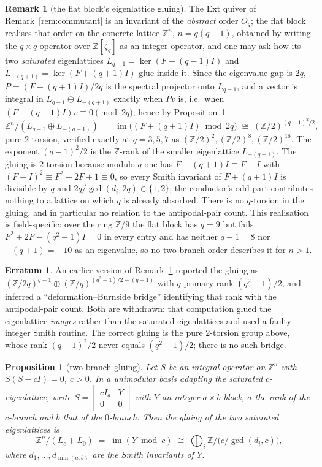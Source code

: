 \documentclass[11pt]{article}
\theoremstyle{plain}
\newtheorem{proposition}[theorem]{Proposition}
\theoremstyle{definition}
\newtheorem{remark}[theorem]{Remark}
\newtheorem{erratum}[theorem]{Erratum}
\newcommand{\ZZ}{\mathbb Z}
\begin{document}
\begin{remark}[the flat block's eigenlattice gluing]\label{rem:real-gluing}
The Ext quiver of Remark~\ref{rem:commutant} is an invariant of the
\emph{abstract} order $O_q$; the flat block realises that order on the concrete
lattice $\ZZ^n$, $n=q(q-1)$, obtained by writing the $q\times q$ operator over
$\ZZ[\zeta_q]$ as an integer operator, and one may ask how its two
\emph{saturated} eigenlattices $L_{q-1}=\ker(F-(q-1)I)$ and
$L_{-(q+1)}=\ker(F+(q+1)I)$ glue inside it. Since the eigenvalue gap is $2q$,
$P=(F+(q+1)I)/2q$ is the spectral projector onto $L_{q-1}$, and a vector is
integral in $L_{q-1}\oplus L_{-(q+1)}$ exactly when $Pv$ is, i.e.\ when
$(F+(q+1)I)v\equiv 0\pmod{2q}$; hence by Proposition~\ref{prop:two-branch}
\[
\ZZ^n/(L_{q-1}\oplus L_{-(q+1)})\;=\;\operatorname{im}\bigl((F+(q+1)I)\bmod 2q\bigr)
\;\cong\;(\ZZ/2)^{(q-1)^2/2},
\]
pure $2$-torsion, verified exactly at $q=3,5,7$ as $(\ZZ/2)^2,(\ZZ/2)^8,
(\ZZ/2)^{18}$. The exponent $(q-1)^2/2$ is the $\ZZ$-rank of the smaller
eigenlattice $L_{-(q+1)}$. The gluing is $2$-torsion because modulo $q$ one has
$F+(q+1)I\equiv F+I$ with $(F+I)^2\equiv F^2+2F+1\equiv 0$, so every Smith
invariant of $F+(q+1)I$ is divisible by $q$ and $2q/\gcd(d_i,2q)\in\{1,2\}$; the
conductor's odd part contributes nothing to a lattice on which $q$ is already
absorbed. There is no $q$-torsion in the gluing, and in particular no relation to
the antipodal-pair count. This realisation is field-specific: over the ring
$\ZZ/9$ the flat block has $q=9$ but fails $F^2+2F-(q^2-1)I=0$ in every entry and
has neither $q-1=8$ nor $-(q+1)=-10$ as an eigenvalue, so no two-branch order
describes it for $n>1$.
\end{remark}

\begin{erratum}\label{err:gluing}
An earlier version of Remark~\ref{rem:real-gluing} reported the gluing as
$(\ZZ/2q)^{q-1}\oplus(\ZZ/q)^{(q^2-1)/2-(q-1)}$ with $q$-primary rank
$(q^2-1)/2$, and inferred a ``deformation--Burnside bridge'' identifying that
rank with the antipodal-pair count. Both are withdrawn: that computation glued
the eigenlattice \emph{images} rather than the saturated eigenlattices and used a
faulty integer Smith routine. The correct gluing is the pure $2$-torsion group
above, whose rank $(q-1)^2/2$ never equals $(q^2-1)/2$; there is no such bridge.
\end{erratum}

\begin{proposition}[two-branch gluing]\label{prop:two-branch}
Let $S$ be an integral operator on $\ZZ^n$ with $S(S-cI)=0$, $c>0$. In a
unimodular basis adapting the saturated $c$-eigenlattice, write
$S=\left[\begin{smallmatrix}cI_a & Y\\ 0 & 0\end{smallmatrix}\right]$ with $Y$ an
integer $a\times b$ block, $a$ the rank of the $c$-branch and $b$ that of the
$0$-branch. Then the gluing of the two saturated eigenlattices is
\[
\ZZ^n/(L_c+L_0)\;=\;\operatorname{im}(Y\bmod c)\;\cong\;
\bigoplus_i \ZZ/\!\bigl(c/\gcd(d_i,c)\bigr),
\]
where $d_1,\dots,d_{\min(a,b)}$ are the Smith invariants of $Y$.
\end{proposition}
\end{document}
